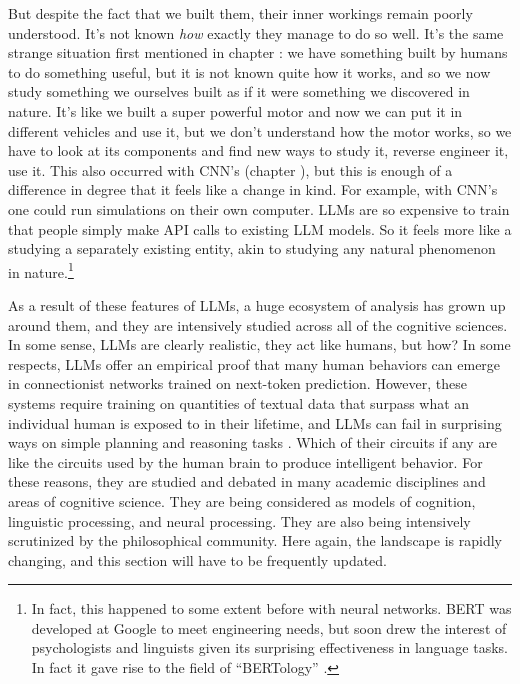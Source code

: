 But despite the fact that we built them, their inner workings remain poorly understood. It's not known \emph{how} exactly they manage to do so well. It's the same strange situation first mentioned in chapter : we have something built by humans to do something useful, but it is not known quite how it works, and so we now study something we ourselves built as if it were something we discovered  in nature. It's like we built a super powerful motor and now we can put it in different vehicles and use it, but we don't understand how the motor works, so we have to look at its components and find new ways to study it, reverse engineer it, use it. This also occurred with CNN's (chapter ), but this is enough of a difference in degree that it feels like a change in kind. For example, with CNN's one could run simulations on their own computer.  LLMs are so expensive to train that people simply make API calls to existing LLM models. So it feels more like a studying a separately existing entity, akin to studying any natural phenomenon in nature.\footnote{In fact, this happened  to some extent before with neural networks.  BERT was developed at Google to meet engineering needs, but soon drew the interest of psychologists and linguists given its surprising effectiveness in language tasks. In fact it gave rise to the field of  ``BERTology'' \cite{rogers2020primer}.}

As a result of these features of LLMs, a huge ecosystem of analysis has grown up around them, and they are intensively studied across all of the cognitive sciences. In some sense, LLMs are clearly realistic, they act like humans, but how? In some respects, LLMs offer an empirical proof that many human behaviors can emerge in connectionist networks trained on next-token prediction. However, these systems require training on quantities of textual data that surpass what an individual human is exposed to in their lifetime, and LLMs can fail in surprising ways on simple planning and reasoning tasks \cite{momennejad2023cogeval}. Which of their circuits if any are like the circuits used by the human brain to produce intelligent behavior. For these reasons, they are studied and debated in many academic disciplines and areas of cognitive science. They are being considered as models of cognition, linguistic processing, and neural processing. They are also being intensively scrutinized by the philosophical community.  Here again, the landscape is rapidly changing, and this section will have to be frequently updated.

